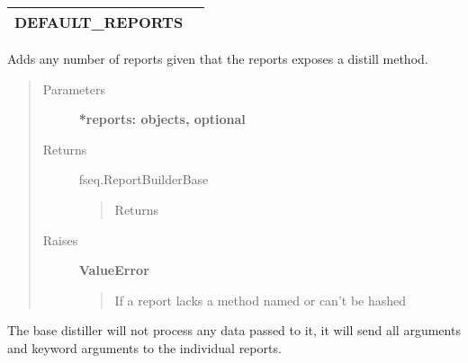 \documentclass[letterpaper,10pt,english]{sphinxmanual}
\begin{document}
\begin{fulllineitems}
\begin{tabulary}{\linewidth}{|L|L|}
\hline

DEFAULT\_REPORTS
 & \\
\hline\end{tabulary}


\begin{fulllineitems}
\label{fseq.reporting:fseq.reporting.report_builder.ReportBuilderBase.DEFAULT_REPORTS}
\end{fulllineitems}


\begin{fulllineitems}
\label{fseq.reporting:fseq.reporting.report_builder.ReportBuilderBase.addReports}
Adds any number of reports given that the reports exposes a 
distill method.
\begin{quote}\begin{description}
\item[{Parameters}] \leavevmode
\textbf{*reports: objects, optional}

\item[{Returns}] \leavevmode
fseq.ReportBuilderBase
\begin{quote}

Returns 
\end{quote}

\item[{Raises}] \leavevmode
\textbf{ValueError}
\begin{quote}

If a report lacks a method named  or can't be hashed
\end{quote}

\end{description}\end{quote}

\end{fulllineitems}


\begin{fulllineitems}
\label{fseq.reporting:fseq.reporting.report_builder.ReportBuilderBase.distill}
The base distiller will not process any data passed to it,
it will send all arguments and keyword arguments to the individual
reports.


\end{fulllineitems}
\end{fulllineitems}
\end{document}
